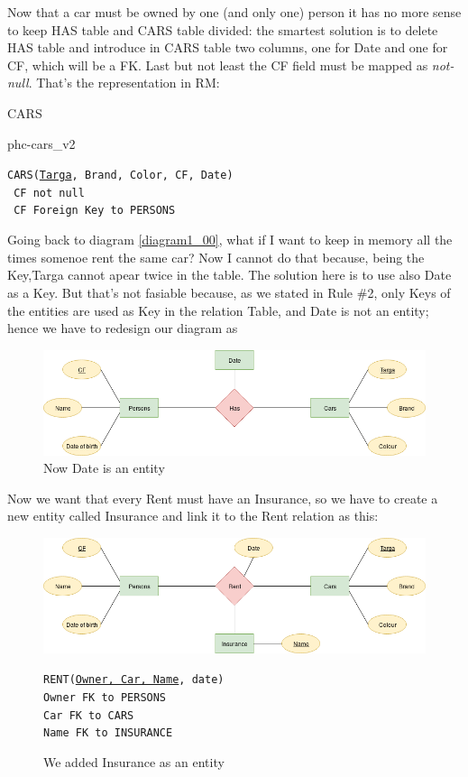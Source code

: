 \documentclass[class=book, crop=false, oneside]{standalone}
\begin{document}
Now that a car must be owned by one (and only one) person it has no more sense to keep HAS table and CARS table divided: the smartest solution is to delete HAS table and introduce in CARS table two columns, one for Date and one for CF, which will be a FK. Last but not least the CF field must be mapped as \emph{not-null}.
That's the representation in RM:
\vskip 20pt
\begin{minipage}{.8\textwidth}
	CARS
	\begin{table}[H]
		{phc-cars_v2}
	\end{table}
	\texttt{CARS(\underline{Targa}, Brand, Color, CF, Date)}\\
	\texttt{	CF not null}\\
	\texttt{	CF Foreign Key to PERSONS}
\end{minipage}
\vskip 20pt

Going back to diagram \ref{diagram1_00}, what if I want to keep in memory all the times somenoe rent the same car?
Now I cannot do that because, being the Key,Targa cannot apear twice in the table.
The solution here is to use also Date as a Key.
But that's not fasiable because, as we stated in Rule \#2, only Keys of the entities are used as Key in the relation Table, and Date is not an entity; hence we have to redesign our diagram as
\begin{figure}[H]
	\includegraphics[width=\textwidth,keepaspectratio]{diagram1_03.png}
	\caption{Now Date is an entity}
	\label{diagram1_03}
\end{figure}
\vskip 20pt

Now we want that every Rent must have an Insurance, so we have to create a new entity called Insurance and link it to the Rent relation as this:
\begin{figure}[H]
	\includegraphics[width=\textwidth,keepaspectratio]{diagram1_04.png}
	\caption{We added Insurance as an entity}
	\texttt{RENT(\underline{Owner, Car, Name}, date)}\\
		\texttt{Owner FK to PERSONS}\\
		\texttt{Car FK to CARS}\\
		\texttt{Name FK to INSURANCE}
	\label{diagram1_04}
\end{figure}
\vskip 20pt
\end{document}
